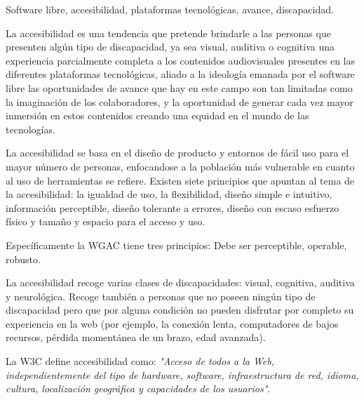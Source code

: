 \begin{multicols}{2}



 Software libre, accesibilidad, plataformas tecnológicas, avance, discapacidad.



La accesibilidad es una tendencia que pretende brindarle a las personas que presenten algún tipo de discapacidad, ya sea visual, auditiva o cognitiva una experiencia parcialmente completa a los contenidos audiovisuales presentes en las diferentes plataformas tecnológicas, aliado a la ideología emanada por el software libre las oportunidades de avance que hay en este campo son tan limitadas como la imaginación de los colaboradores, y la oportunidad de generar cada vez mayor inmersión en estos contenidos creando una equidad en el mundo de las tecnologías.
 
\noindent


La accesibilidad se basa en el diseño de producto y entornos de fácil uso para el mayor número de personas, enfocandose a la población más vulnerable en cuanto al uso de herramientas se refiere. Existen siete principios que apuntan al tema de la accesibilidad: la igualdad de uso, la flexibilidad, diseño simple e intuitivo, información perceptible, diseño tolerante a errores, diseño con escaso esfuerzo físico y tamaño y espacio para el acceso y uso.

Específicamente la WGAC tiene tres principios: Debe ser perceptible, operable, robusto.

La accesibilidad recoge varias clases de discapacidades: visual, cognitiva, auditiva y neurológica. Recoge también a personas que no poseen ningún tipo de discapacidad pero que por alguna condición no pueden disfrutar por completo su experiencia en la web (por ejemplo, la conexión lenta, computadores de bajos recursos, pérdida momentánea de un brazo, edad avanzada).

La W3C define accesibilidad como: \textit{"Acceso de todos a la Web, independientemente del tipo de hardware, software, infraestructura de red, idioma, cultura, localización geográfica y capacidades de los usuarios"}.



\end{multicols}
